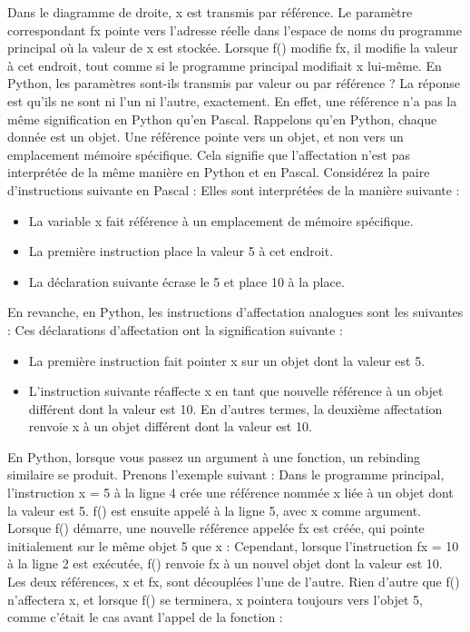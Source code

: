 Dans le diagramme de droite, x est transmis par référence.  Le paramètre correspondant fx pointe vers l'adresse réelle dans l'espace de noms du programme principal où la valeur de x est stockée.  Lorsque f() modifie fx, il modifie la valeur à cet endroit, tout comme si le programme principal modifiait x lui-même.
En Python, les paramètres sont-ils transmis par valeur ou par référence ?  La réponse est qu'ils ne sont ni l'un ni l'autre, exactement.  En effet, une référence n'a pas la même signification en Python qu'en Pascal.
Rappelons qu'en Python, chaque donnée est un objet. Une référence pointe vers un objet, et non vers un emplacement mémoire spécifique.  Cela signifie que l'affectation n'est pas interprétée de la même manière en Python et en Pascal.  Considérez la paire d'instructions suivante en Pascal :
Elles sont interprétées de la manière suivante :
\begin{itemize}
\item La variable x fait référence à un emplacement de mémoire spécifique.
\item La première instruction place la valeur 5 à cet endroit.
\item La déclaration suivante écrase le 5 et place 10 à la place.
\end{itemize}
En revanche, en Python, les instructions d'affectation analogues sont les suivantes :
Ces déclarations d'affectation ont la signification suivante :
\begin{itemize}
\item La première instruction fait pointer x sur un objet dont la valeur est 5.
\item L'instruction suivante réaffecte x en tant que nouvelle référence à un objet différent dont la valeur est 10. En d'autres termes, la deuxième affectation renvoie x à un objet différent dont la valeur est 10.
\end{itemize}
En Python, lorsque vous passez un argument à une fonction, un rebinding similaire se produit.  Prenons l'exemple suivant :
Dans le programme principal, l'instruction x = 5 à la ligne 4 crée une référence nommée x liée à un objet dont la valeur est 5. f() est ensuite appelé à la ligne 5, avec x comme argument.  Lorsque f() démarre, une nouvelle référence appelée fx est créée, qui pointe initialement sur le même objet 5 que x :
Cependant, lorsque l'instruction fx = 10 à la ligne 2 est exécutée, f() renvoie fx à un nouvel objet dont la valeur est 10.  Les deux références, x et fx, sont découplées l'une de l'autre. Rien d'autre que f() n'affectera x, et lorsque f() se terminera, x pointera toujours vers l'objet 5, comme c'était le cas avant l'appel de la fonction :
